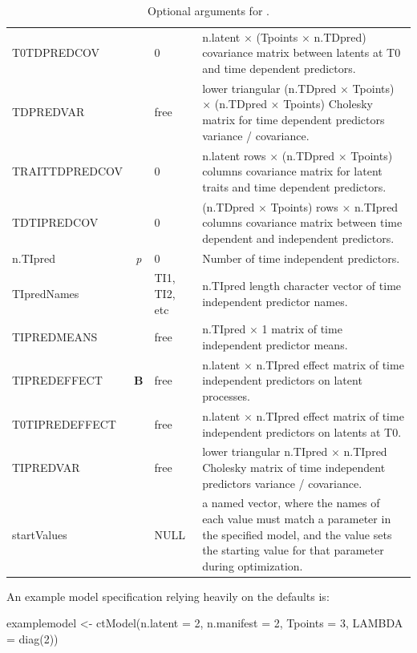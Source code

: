 \documentclass[nojss]{jss}\usepackage[]{graphicx}\usepackage[]{color}
\begin{document}
\begin{table}
\begin{tabular}{@{}l@{}|@{}c@{}|l@{}| p{8.6cm} }
T0TDPREDCOV & & 0 & n.latent $\times$ (Tpoints $\times$ n.TDpred) covariance matrix between latents at T0 and time dependent predictors.\\
TDPREDVAR & & free & lower triangular (n.TDpred $\times$ Tpoints) $\times$ (n.TDpred $\times$ Tpoints) Cholesky matrix for time dependent predictors variance / covariance.\\
TRAITTDPREDCOV & & 0 & n.latent rows $\times$ (n.TDpred $\times$ Tpoints) columns covariance matrix for latent traits and time dependent  predictors.\\
TDTIPREDCOV & & 0 & (n.TDpred $\times$ Tpoints) rows $\times$ n.TIpred columns covariance matrix between time dependent and independent predictors.\\
n.TIpred & \textit{p} & 0 & Number of time independent predictors.\\ 
TIpredNames & & TI1, TI2, etc & n.TIpred length character vector of time independent predictor names.\\
TIPREDMEANS & & free & n.TIpred $\times$ 1 matrix of time independent predictor means.\\
TIPREDEFFECT & $\textbf{B}$ & free & n.latent $\times$ n.TIpred effect matrix of time independent predictors on latent processes.\\
T0TIPREDEFFECT & & free & n.latent $\times$ n.TIpred effect matrix of time independent  predictors on latents at T0.\\
TIPREDVAR & & free & lower triangular n.TIpred $\times$ n.TIpred Cholesky matrix of time independent predictors variance / covariance.\\
startValues & & NULL & a named vector, where the names of each value must match a parameter in the specified model, and the value sets the starting value for that parameter during optimization.\\
\end{tabular}
\caption{\label{table:ctspecoptional}Optional arguments for .}
\end{table}
An example model specification relying heavily on the defaults is: 
\begin{Schunk}
\begin{Sinput}
examplemodel <- ctModel(n.latent = 2, n.manifest = 2, Tpoints = 3, 
  LAMBDA = diag(2))
\end{Sinput}
\end{Schunk}
\end{document}
